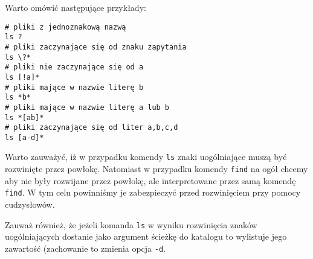 \documentclass{pdfBooklets}
\begin{document}
\begin{teacherOnly}
Warto omówić następujące przykłady:
\begin{Verbatim}
# pliki z jednoznakową nazwą
ls ?
# pliki zaczynające się od znaku zapytania
ls \?*
# pliki nie zaczynające się od a
ls [!a]*
# pliki mające w nazwie literę b
ls *b*
# pliki mające w nazwie literę a lub b
ls *[ab]*
# pliki zaczynające się od liter a,b,c,d
ls [a-d]*
\end{Verbatim}
\end{teacherOnly}

Warto zauważyć, iż w przypadku komendy \texttt{ls} znaki uogólniające muszą być rozwinięte przez powłokę.
Natomiast w przypadku komendy \texttt{find} na ogół chcemy aby nie były rozwijane przez powłokę, ale interpretowane przez samą komendę \texttt{find}.
W tym celu powinniśmy je zabezpieczyć przed rozwinięciem przy pomocy cudzysłowów.

Zauważ również, że jeżeli komanda \texttt{ls} w wyniku rozwinięcia znaków uogólniających dostanie jako argument ścieżkę do katalogu to wylistuje jego zawartość (zachowanie to zmienia opcja \texttt{-d}.
\end{document}

